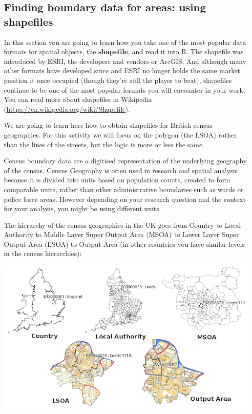 \documentclass[
]{book}
\begin{document}
\hypertarget{finding-boundary-data-for-areas-using-shapefiles}{%
\subsection{Finding boundary data for areas: using shapefiles}\label{finding-boundary-data-for-areas-using-shapefiles}}

In this section you are going to learn how you take one of the most popular data formats for spatial objects, the \textbf{shapefile}, and read it into R. The shapefile was introduced by ESRI, the developers and vendors or ArcGIS. And although many other formats have developed since and ESRI no longer holds the same market position it once occupied (though they're still the player to beat), shapefiles continue to be one of the most popular formats you will encounter in your work. You can read more about shapefiles in Wikipedia (\url{https://en.wikipedia.org/wiki/Shapefile}).

We are going to learn here how to obtain shapefiles for British census geographies. For this activity we will focus on the polygon (the LSOA) rather than the lines of the streets, but the logic is more or less the same.

Census boundary data are a digitised representation of the underlying geography of the census. Census Geography is often used in research and spatial analysis because it is divided into units based on population counts, created to form comparable units, rather than other administrative boundaries such as wards or police force areas. However depending on your research question and the context for your analysis, you might be using different units.

The hierarchy of the census geographies in the UK goes from Country to Local Authority to Middle Layer Super Output Area (MSOA) to Lower Layer Super Output Area (LSOA) to Output Area (in other countries you have similar levels in the census hierarchies):

\includegraphics{img/maps_geography_types.png}
\end{document}
